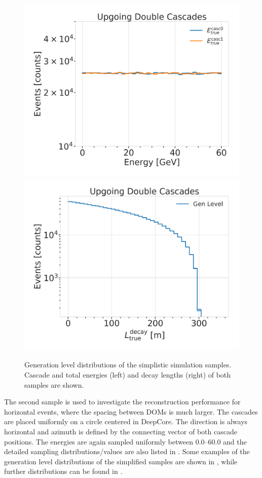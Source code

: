 \begin{figure}[h]
    \centering
    \includegraphics[width=.49\linewidth]{figures/model_independent_simulation/gen_level/1_d_distr_energies_clipped.png}
    \includegraphics[width=.49\linewidth]{figures/model_independent_simulation/gen_level/1_d_distr_true_decay_length_clipped.png}
    \caption[Simplified model independent simulation generation level distributions]{Generation level distributions of the simplistic simulation samples. Cascade and total energies (left) and decay lengths (right) of both samples are shown.}
\end{figure}


The second sample is used to investigate the reconstruction performance for horizontal events, where the spacing between DOMs is much larger. The cascades are placed uniformly on a circle centered in DeepCore. The direction is always horizontal and azimuth is defined by the connecting vector of both cascade positions. The energies are again sampled uniformly between \SIrange[range-phrase={~and~}]{0.0}{60.0}{\gev} and the detailed sampling distributions/values are also listed in . Some examples of the generation level distributions of the simplified samples are shown in , while further distributions can be found in .


